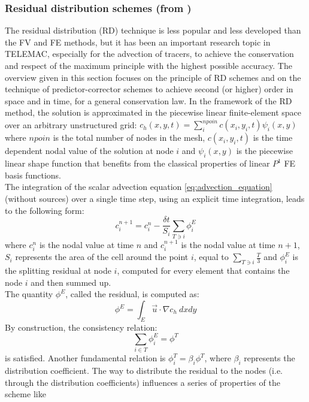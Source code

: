 \subsubsection{Residual distribution schemes (from \cite{Pavan2016})}
The residual distribution (RD) technique is less popular and less developed than the FV and FE methods, but it has been an important research topic in TELEMAC, especially
for the advection of tracers, to achieve the conservation and respect of the maximum principle with the highest possible accuracy.
%
The overview given in this section focuses on the principle of RD schemes and on the technique of predictor-corrector schemes to achieve second (or higher) order
in space and in time, for a general conservation law.
%
In the framework of the RD method, the solution is approximated in the piecewise linear finite-element space
over an arbitrary unstructured grid: $c_h(x,y,t)=\sum \limits_i^{npoin} c(x_i,y_i,t)\psi_i(x,y)$ where
$npoin$ is the total number of nodes in the mesh, $c(x_i,y_i,t)$ is the time dependent nodal value of the
solution at node $i$ and $\psi_i(x,y)$ is the piecewise linear shape function that benefits from the
classical properties of linear $P^1$ FE basis functions. \\
The integration of the scalar advection equation \eqref{eq:advection_equation} (without sources) over a single time step, using an explicit time integration, leads to the following form:
\begin{equation}
 c_i^{n+1}=c_i^n-\frac{\delta t}{S_i}\sum \limits_{T \ni i} \phi_i^E
\label{prot:steady:trans}
\end{equation}
where $c_i^n$ is the nodal value at time $n$ and $c_i^{n+1}$ is the nodal value at time $n+1$, $S_i$ represents the area of the cell around the point $i$, equal to $\sum \limits_{T \ni i}\frac{T}{3}$
and $\phi_i^E$ is the splitting residual at node $i$, computed for every element that contains the node $i$ and then summed up. \\
The quantity $\phi^E$, called the residual, is computed as:
\begin{equation}
 \phi^E=\int_E \vec{u} \cdot \nabla c_h ~dxdy
\end{equation}
By construction, the consistency relation:
\begin{equation}
 \sum \limits_{i \in T} \phi_i^E = \phi^T
\end{equation}
is satisfied. Another fundamental relation is $\phi_i^T=\beta_i\phi^T$,
where $\beta_i$ represents the distribution coefficient.
The way to distribute the residual to the nodes (i.e. through the distribution coefficients) influences a series of properties of the scheme like
